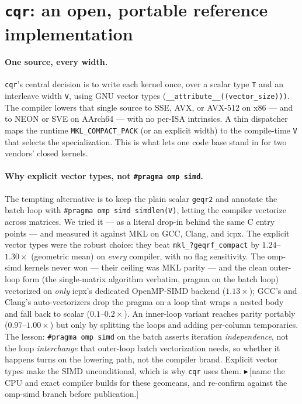 \documentclass[11pt]{article}
\newif\ifdraftmode \draftmodetrue
\newcommand{\draftnote}[1]{\ifdraftmode{\textcolor{orange!85!black}{\small$\blacktriangleright$\,\textsf{[#1]}}}\fi}
\newcommand{\code}[1]{\texttt{#1}}
\newcommand{\cqr}{\mbox{\texttt{cqr}}}
\begin{document}
\section{\cqr{}: an open, portable reference implementation}
\label{sec:cqr}

\paragraph{One source, every width.}
\cqr{}'s central decision is to write each kernel once, over a scalar type
\code{T} and an interleave width \code{V}, using GNU vector types
(\code{\_\_attribute\_\_((vector\_size)))}. The compiler lowers that single
source to SSE, AVX, or AVX-512 on x86 --- and to NEON or SVE on AArch64 --- with
no per-ISA intrinsics. A thin dispatcher maps the runtime
\code{MKL\_COMPACT\_PACK} (or an explicit width) to the compile-time \code{V}
that selects the specialization. This is what lets one code base stand in for two
vendors' closed kernels.

\paragraph{Why explicit vector types, not \code{\#pragma omp simd}.}
The tempting alternative is to keep the plain scalar \code{geqr2} and annotate the
batch loop with \code{\#pragma omp simd simdlen(V)}, letting the compiler vectorize
across matrices. We tried it --- as a literal drop-in behind the same C entry
points --- and measured it against MKL on GCC, Clang, and icpx. The explicit vector
types were the robust choice: they beat \code{mkl\_?geqrf\_compact} by
$1.24$--$1.30\times$ (geometric mean) on \emph{every} compiler, with no flag
sensitivity. The omp-simd kernels never won --- their ceiling was MKL parity ---
and the clean outer-loop form (the single-matrix algorithm verbatim, pragma on the
batch loop) vectorized on \emph{only} icpx's dedicated OpenMP-SIMD backend
($1.13\times$); GCC's and Clang's auto-vectorizers drop the pragma on a loop that
wraps a nested body and fall back to scalar ($0.1$--$0.2\times$). An inner-loop
variant reaches parity portably ($0.97$--$1.00\times$) but only by splitting the
loops and adding per-column temporaries. The lesson: \code{\#pragma omp simd} on
the batch asserts iteration \emph{independence}, not the loop \emph{interchange}
that outer-loop batch vectorization needs, so whether it happens turns on the
lowering path, not the compiler brand. Explicit vector types make the SIMD
unconditional, which is why \cqr{} uses them. \draftnote{name the CPU and exact
compiler builds for these geomeans, and re-confirm against the omp-simd branch
before publication.}
\end{document}
